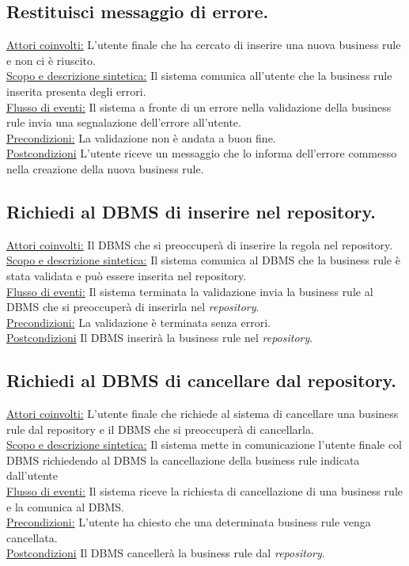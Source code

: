 \subsection{Restituisci messaggio di errore.}
\underline{Attori coinvolti:} L'utente finale che ha cercato di inserire una nuova business rule e non ci \`e riuscito.\\
\underline{Scopo e descrizione sintetica:} Il sistema comunica all'utente che la business rule inserita presenta degli errori.\\
\underline{Flusso di eventi:} Il sistema  a fronte di un errore nella validazione della business rule invia una segnalazione dell'errore all'utente.\\
\underline{Precondizioni:} La validazione non \`e andata a buon fine.\\
\underline{Postcondizioni} L'utente riceve un messaggio che lo informa dell'errore commesso nella creazione della nuova business rule.

\subsection{Richiedi al DBMS di inserire nel repository.}
\underline{Attori coinvolti:} Il DBMS che si preoccuper\`a di inserire la regola nel repository.\\
\underline{Scopo e descrizione sintetica:} Il sistema comunica al DBMS che la business rule \`e stata validata e pu\`o essere inserita nel repository.\\
\underline{Flusso di eventi:} Il sistema  terminata la validazione invia la business rule al DBMS che si preoccuper\`a di inserirla nel \textit{repository}.\\
\underline{Precondizioni:} La validazione \`e terminata senza errori.\\
\underline{Postcondizioni} Il DBMS inserir\`a la business rule nel \textit{repository}.

\subsection{Richiedi al DBMS di cancellare dal repository.}
\underline{Attori coinvolti:} L'utente finale che richiede al sistema di cancellare una business rule dal repository e il DBMS che si preoccuper\`a di cancellarla.\\
\underline{Scopo e descrizione sintetica:} Il sistema mette in comunicazione l'utente finale col DBMS richiedendo al DBMS la cancellazione della business rule indicata dall'utente\\
\underline{Flusso di eventi:} Il sistema riceve la richiesta di cancellazione di una business rule e la comunica al DBMS.\\
\underline{Precondizioni:} L'utente ha chiesto che una determinata business rule venga cancellata.\\
\underline{Postcondizioni} Il DBMS canceller\`a la business rule dal \textit{repository}.



